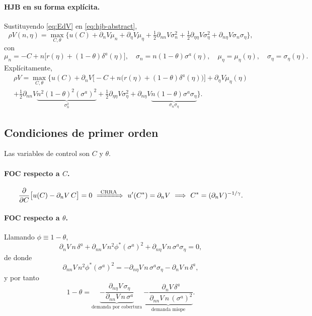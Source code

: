 \documentclass[11pt]{article}
\theoremstyle{definition}
\theoremstyle{remark}
\newcommand{\pV}[1]{\partial_{#1} V}
\begin{document}
\paragraph{HJB en su forma explícita.} Sustituyendo \eqref{eq:EdV} en \eqref{eq:hjb-abstract},
\begin{equation}
\rho V(n,\eta)=\max_{C,\theta}\Big\{u(C)+\pV{n}\mu_n+\pV{\eta}\mu_\eta
+\tfrac12\pV{nn}\sigma_n^2+\tfrac12\pV{\eta\eta}\sigma_\eta^2+\pV{n\eta}\sigma_n\sigma_\eta\Big\},
\end{equation}
con
\[
\mu_n=-C+n\big[r(\eta)+(1-\theta)\delta^{a}(\eta)\big],\quad
\sigma_n=n(1-\theta)\sigma^{a}(\eta),\quad
\mu_\eta=\mu_\eta(\eta),\quad \sigma_\eta=\sigma_\eta(\eta).
\]
Explícitamente,
\begin{multline}\label{eq:hjb-full}
\rho V=\max_{C,\theta}\Big\{u(C)+\pV{n}\big[-C+n\big(r(\eta)+(1-\theta)\delta^{a}(\eta)\big)\big]+\pV{\eta}\mu_\eta(\eta)\\
+\tfrac12\pV{nn}\underbrace{n^2(1-\theta)^2(\sigma^{a})^2}_{\sigma_n^2}
+\tfrac12\pV{\eta\eta}\sigma_\eta^2
+\pV{n\eta}\underbrace{n(1-\theta)\sigma^{a}\sigma_\eta}_{\sigma_n\sigma_\eta}\Big\}.
\end{multline}

\subsection{Condiciones de primer orden}

Las variables de control son $C$ y $\theta$.

\paragraph{FOC respecto a $C$.}
\[
\frac{\partial}{\partial C}\big[u(C)-\pV{n}\,C\big]=0
\ \xRightarrow{\ \text{CRRA}\ }\ u'(C^*)=\pV{n}
\ \Longrightarrow\ C^{*}=(\pV{n})^{-1/\gamma}.
\]

\paragraph{FOC respecto a $\theta$.} Llamando $\phi\equiv 1-\theta$,
\[
\pV{n}\,n\,\delta^{a}+\pV{nn}\,n^2\phi^*(\sigma^{a})^2+\pV{n\eta}\,n\,\sigma^{a}\sigma_\eta=0,
\]
de donde
\[
\pV{nn}\,n^2\phi^*(\sigma^{a})^2=-\pV{n\eta}\,n\,\sigma^{a}\sigma_\eta-\pV{n}\,n\,\delta^{a},
\]
y por tanto
\begin{equation}\label{eq:portfolio-general}
1-\theta
=\underbrace{-\frac{\pV{n\eta}\,\sigma_\eta}{\pV{nn}\,n\,\sigma^{a}}}_{\text{demanda por cobertura}}
\ \underbrace{-\frac{\pV{n}\,\delta^{a}}{\pV{nn}\,n\,(\sigma^{a})^2}}_{\text{demanda miope}}.
\end{equation}
\end{document}
